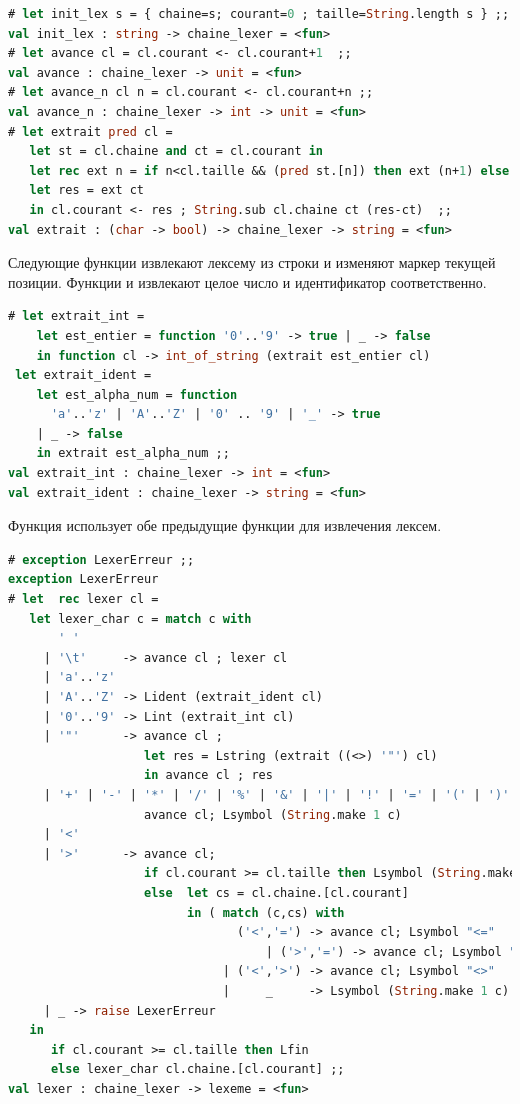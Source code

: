\begin{lstlisting}[language=OCaml]
# let init_lex s = { chaine=s; courant=0 ; taille=String.length s } ;;
val init_lex : string -> chaine_lexer = <fun>
# let avance cl = cl.courant <- cl.courant+1  ;;
val avance : chaine_lexer -> unit = <fun>
# let avance_n cl n = cl.courant <- cl.courant+n ;;
val avance_n : chaine_lexer -> int -> unit = <fun>
# let extrait pred cl = 
   let st = cl.chaine and ct = cl.courant in
   let rec ext n = if n<cl.taille && (pred st.[n]) then ext (n+1) else n in 
   let res = ext ct 
   in cl.courant <- res ; String.sub cl.chaine ct (res-ct)  ;;
val extrait : (char -> bool) -> chaine_lexer -> string = <fun>
\end{lstlisting}

Следующие функции извлекают лексему из строки и изменяют маркер текущей позиции. 
Функции  и  извлекают целое число и 
идентификатор соответственно.

\begin{lstlisting}[language=OCaml]
# let extrait_int = 
    let est_entier = function '0'..'9' -> true | _ -> false  
    in function cl -> int_of_string (extrait est_entier cl)
 let extrait_ident =
    let est_alpha_num = function 
      'a'..'z' | 'A'..'Z' | '0' .. '9' | '_' -> true 
    | _ -> false  
    in extrait est_alpha_num ;;
val extrait_int : chaine_lexer -> int = <fun>
val extrait_ident : chaine_lexer -> string = <fun>
\end{lstlisting}

Функция  использует обе предыдущие функции для извлечения лексем.

\begin{lstlisting}[language=OCaml]
# exception LexerErreur ;;
exception LexerErreur
# let  rec lexer cl = 
   let lexer_char c = match c with 
       ' ' 
     | '\t'     -> avance cl ; lexer cl 
     | 'a'..'z' 
     | 'A'..'Z' -> Lident (extrait_ident cl)
     | '0'..'9' -> Lint (extrait_int cl)
     | '"'      -> avance cl ; 
                   let res = Lstring (extrait ((<>) '"') cl) 
                   in avance cl ; res 
     | '+' | '-' | '*' | '/' | '%' | '&' | '|' | '!' | '=' | '(' | ')'  -> 
                   avance cl; Lsymbol (String.make 1 c)
     | '<' 
     | '>'      -> avance cl; 
                   if cl.courant >= cl.taille then Lsymbol (String.make 1 c)
                   else  let cs = cl.chaine.[cl.courant] 
                         in ( match (c,cs) with 
                                ('<','=') -> avance cl; Lsymbol "<=" 
                                    | ('>','=') -> avance cl; Lsymbol ">="
                              | ('<','>') -> avance cl; Lsymbol "<>"
                              |     _     -> Lsymbol (String.make 1 c) )
     | _ -> raise LexerErreur
   in 
      if cl.courant >= cl.taille then Lfin 
      else lexer_char cl.chaine.[cl.courant] ;;
val lexer : chaine_lexer -> lexeme = <fun>
\end{lstlisting}

